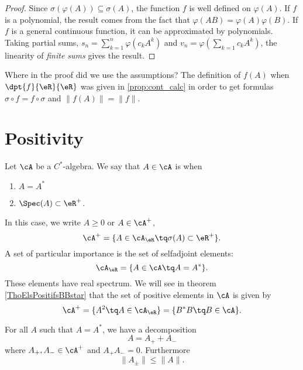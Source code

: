 \begin{proof}
Since $\sigma(\varphi(A))\subseteq\sigma(A)$, the function $f$ is well defined on $\varphi(A)$. If $f$ is a polynomial, the result comes from the fact that $\varphi(AB)=\varphi(A)\varphi(B)$. If $f$ is a general continuous function, it can be approximated by polynomials. Taking partial sums, $s_n=\sum_{k=1}^n\varphi(c_kA^k)$ and $v_n=\varphi(\sum_{k=1}c_kA^k)$, the linearity of \emph{finite sums} gives the result.
\end{proof}

Where in the proof did we use the assumptions? The definition of $f(A)$ when $\dpt{f}{\eR}{\eR}$ was given in \ref{prop:cont_calc} in order to get formulas $\sigma\circ f=f\circ\sigma$ and $\| f(A) \|=\| f \|$.

\section{Positivity}

Let $\cA$ be a $C^*$-algebra. We say that $A\in\cA$ is  when 
\begin{enumerate}
\item  $A=A^*$
\item  $\Spec(A)\subset\eR^+$.
\end{enumerate}
In this case, we write $A\geq 0$ or $A\in\cA^+$,
\[ 
  \cA^+=\{ A\in\cA_{\eR}\tq\sigma(A)\subset\eR^+ \}.
\]
A set of particular importance is the set of selfadjoint elements:
\begin{equation}
    \cA_{\eR}=\{ A\in\cA\tq A=A^* \}.
\end{equation}
These elements have real spectrum. We will see in theorem \ref{ThoElsPositifsBBstar} that the set of positive elements in $\cA$ is given by
\begin{equation}
    \cA^+=\{ A^2\tq A\in\cA_{\eR} \}=\{ B^*B\tq B\in\cA \}.
\end{equation}

\begin{lemma}
For all $A$ such that $A=A^*$, we have a decomposition
\[ 
  A=A_++A_-
\]
where $A_+,A_-\in\cA^+$ and $A_+A_-=0$. Furthermore
\[ 
  \| A_{\pm} \|\leq \| A \|.
\]
 \label{lem:AsAdecm}
\end{lemma}

